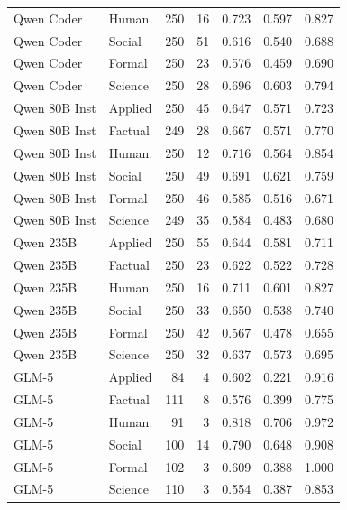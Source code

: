 \begin{longtable}{llrrrrr}
Qwen Coder & Human. & 250 & 16 & 0.723 & 0.597 & 0.827 \\
Qwen Coder & Social & 250 & 51 & 0.616 & 0.540 & 0.688 \\
Qwen Coder & Formal & 250 & 23 & 0.576 & 0.459 & 0.690 \\
Qwen Coder & Science & 250 & 28 & 0.696 & 0.603 & 0.794 \\
Qwen 80B Inst & Applied & 250 & 45 & 0.647 & 0.571 & 0.723 \\
Qwen 80B Inst & Factual & 249 & 28 & 0.667 & 0.571 & 0.770 \\
Qwen 80B Inst & Human. & 250 & 12 & 0.716 & 0.564 & 0.854 \\
Qwen 80B Inst & Social & 250 & 49 & 0.691 & 0.621 & 0.759 \\
Qwen 80B Inst & Formal & 250 & 46 & 0.585 & 0.516 & 0.671 \\
Qwen 80B Inst & Science & 249 & 35 & 0.584 & 0.483 & 0.680 \\
Qwen 235B & Applied & 250 & 55 & 0.644 & 0.581 & 0.711 \\
Qwen 235B & Factual & 250 & 23 & 0.622 & 0.522 & 0.728 \\
Qwen 235B & Human. & 250 & 16 & 0.711 & 0.601 & 0.827 \\
Qwen 235B & Social & 250 & 33 & 0.650 & 0.538 & 0.740 \\
Qwen 235B & Formal & 250 & 42 & 0.567 & 0.478 & 0.655 \\
Qwen 235B & Science & 250 & 32 & 0.637 & 0.573 & 0.695 \\
GLM-5 & Applied & 84 & 4 & 0.602 & 0.221 & 0.916 \\
GLM-5 & Factual & 111 & 8 & 0.576 & 0.399 & 0.775 \\
GLM-5 & Human. & 91 & 3 & 0.818 & 0.706 & 0.972 \\
GLM-5 & Social & 100 & 14 & 0.790 & 0.648 & 0.908 \\
GLM-5 & Formal & 102 & 3 & 0.609 & 0.388 & 1.000 \\
GLM-5 & Science & 110 & 3 & 0.554 & 0.387 & 0.853 \\
\end{longtable}

